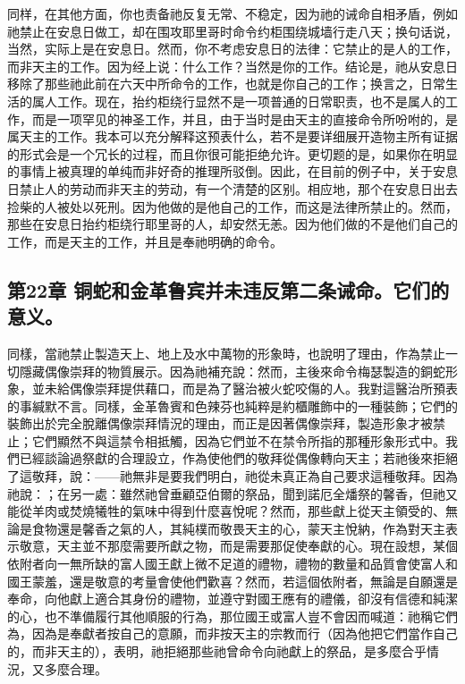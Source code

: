 同样，在其他方面，你也责备祂反复无常、不稳定，因为祂的诫命自相矛盾，例如祂禁止在安息日做工，却在围攻耶里哥时命令约柜围绕城墙行走八天；换句话说，当然，实际上是在安息日。然而，你不考虑安息日的法律：它禁止的是人的工作，而非天主的工作。因为经上说：什么工作？当然是你的工作。结论是，祂从安息日移除了那些祂此前在六天中所命令的工作，也就是你自己的工作；换言之，日常生活的属人工作。现在，抬约柜绕行显然不是一项普通的日常职责，也不是属人的工作，而是一项罕见的神圣工作，并且，由于当时是由天主的直接命令所吩咐的，是属天主的工作。我本可以充分解释这预表什么，若不是要详细展开造物主所有证据的形式会是一个冗长的过程，而且你很可能拒绝允许。更切题的是，如果你在明显的事情上被真理的单纯而非好奇的推理所驳倒。因此，在目前的例子中，关于安息日禁止人的劳动而非天主的劳动，有一个清楚的区别。相应地，那个在安息日出去捡柴的人被处以死刑。因为他做的是他自己的工作，而这是法律所禁止的。然而，那些在安息日抬约柜绕行耶里哥的人，却安然无恙。因为他们做的不是他们自己的工作，而是天主的工作，并且是奉祂明确的命令。\par


\subsection{第22章 铜蛇和金革鲁宾并未违反第二条诫命。它们的意义。}

同樣，當祂禁止製造天上、地上及水中萬物的形象時，也說明了理由，作為禁止一切隱藏偶像崇拜的物質展示。因為祂補充說：然而，主後來命令梅瑟製造的銅蛇形象，並未給偶像崇拜提供藉口，而是為了醫治被火蛇咬傷的人。我對這醫治所預表的事緘默不言。同樣，金革魯賓和色辣芬也純粹是約櫃雕飾中的一種裝飾；它們的裝飾出於完全脫離偶像崇拜情況的理由，而正是因著偶像崇拜，製造形象才被禁止；它們顯然不與這禁令相抵觸，因為它們並不在禁令所指的那種形象形式中。我們已經談論過祭獻的合理設立，作為使他們的敬拜從偶像轉向天主；若祂後來拒絕了這敬拜，說：——祂無非是要我們明白，祂從未真正為自己要求這種敬拜。因為祂說：；在另一處：雖然祂曾垂顧亞伯爾的祭品，聞到諾厄全燔祭的馨香，但祂又能從羊肉或焚燒犧牲的氣味中得到什麼喜悅呢？然而，那些獻上從天主領受的、無論是食物還是馨香之氣的人，其純樸而敬畏天主的心，蒙天主悅納，作為對天主表示敬意，天主並不那麼需要所獻之物，而是需要那促使奉獻的心。現在設想，某個依附者向一無所缺的富人國王獻上微不足道的禮物，禮物的數量和品質會使富人和國王蒙羞，還是敬意的考量會使他們歡喜？然而，若這個依附者，無論是自願還是奉命，向他獻上適合其身份的禮物，並遵守對國王應有的禮儀，卻沒有信德和純潔的心，也不準備履行其他順服的行為，那位國王或富人豈不會因而喊道：祂稱它們為，因為是奉獻者按自己的意願，而非按天主的宗教而行（因為他把它們當作自己的，而非天主的），表明，祂拒絕那些祂曾命令向祂獻上的祭品，是多麼合乎情況，又多麼合理。\par

